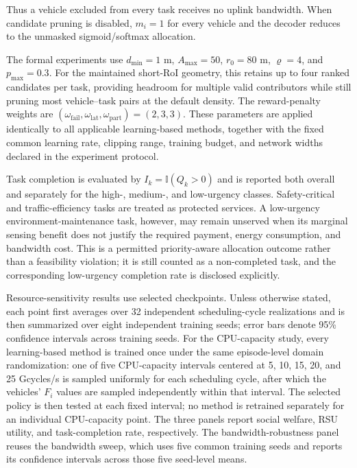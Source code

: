 Thus a vehicle excluded from every task receives no uplink bandwidth. When
candidate pruning is disabled, $m_i=1$ for every vehicle and the decoder
reduces to the unmasked sigmoid/softmax allocation.

The formal experiments use $d_{\min}=1$ m, $A_{\max}=50$, $r_0=80$ m,
$\varrho=4$, and $p_{\max}=0.3$. For the maintained short-RoI geometry, this
retains up to four ranked candidates per task, providing headroom for multiple
valid contributors while still pruning most vehicle--task pairs at the default
density. The reward-penalty weights are
$(\omega_{\mathrm{fail}},\omega_{\mathrm{lat}},
\omega_{\mathrm{part}})=(2,3,3)$. These parameters are applied identically to
all applicable learning-based methods, together with the fixed common learning
rate, clipping range, training budget, and network widths declared in the
experiment protocol.

Task completion is evaluated by
$I_k=\mathbb{I}(Q_k>0)$ and is reported both overall and separately for the
high-, medium-, and low-urgency classes. Safety-critical and traffic-efficiency
tasks are treated as protected services. A low-urgency environment-maintenance
task, however, may remain unserved when its marginal sensing benefit does not
justify the required payment, energy consumption, and bandwidth cost. This is
a permitted priority-aware allocation outcome rather than a feasibility
violation; it is still counted as a non-completed task, and the corresponding
low-urgency completion rate is disclosed explicitly.

Resource-sensitivity results use selected checkpoints. Unless otherwise stated, each point first averages over
32 independent scheduling-cycle realizations and is then summarized over eight
independent training seeds; error bars denote 95\% confidence intervals across
training seeds. For the CPU-capacity study, every learning-based method is
trained once under the same episode-level domain randomization: one of five
CPU-capacity intervals centered at 5, 10, 15, 20, and 25 Gcycles/s is sampled
uniformly for each scheduling cycle, after which the vehicles' $F_i$ values are
sampled independently within that interval. The selected policy is then tested
at each fixed interval; no method is retrained separately for an individual
CPU-capacity point. The three panels report social welfare, RSU utility, and
task-completion rate, respectively.
The bandwidth-robustness panel reuses the bandwidth sweep, which uses
five common training seeds and reports its confidence intervals across those
five seed-level means.

